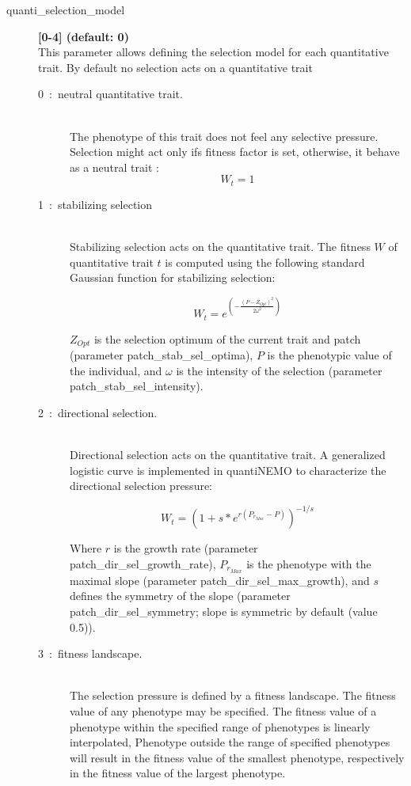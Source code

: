 \documentclass[letterpaper,12pt,oneside]{book}
\begin{document}
\begin{description}
\item[quanti\_selection\_model]\textbf{[0-4] (default: 0)}\\
This parameter allows defining the selection model for each quantitative trait. By default no
selection acts on a quantitative trait
\begin{description}

\item [0~:~neutral quantitative trait.] \textbf{}\\
The phenotype of this trait does not feel any selective pressure. Selection might act only ifs fitness factor is set, otherwise, it behave as a neutral trait :
\[ W_{t} = 1\]
 
\item [1~:~stabilizing selection] \textbf{}\\
Stabilizing selection acts on the quantitative trait. The fitness $W$ of quantitative trait $t$ is
computed using the following standard Gaussian function for stabilizing selection:

\[W_{t} = e^{\left(-\frac{\left(P-Z_{Opt}\right)^2}{2\omega^{2}}\right)} \]

$Z_{Opt}$ is the selection optimum of the current trait and patch (parameter \textsf{patch\_stab\_sel\_optima}), $P$ is the phenotypic value of the individual, and $\omega$ is the intensity of the selection (parameter \textsf{patch\_stab\_sel\_intensity}). 

\item [2~:~directional selection.] \textbf{}\\
Directional selection acts on the quantitative trait. A generalized logistic curve \citep{Richards_1959} is implemented in quantiNEMO to characterize the directional selection pressure:

	\[ W_{t} = \left(1+s*e^{r(P_{r_{Max}}-P)}\right)^{-1/s}\]

Where $r$ is the growth rate (parameter \textsf{patch\_dir\_sel\_growth\_rate}), $P_{r_{Max}}$ is the phenotype with the maximal slope (parameter \textsf{patch\_dir\_sel\_max\_growth}), and $s$ defines the symmetry of the slope (parameter \textsf{patch\_dir\_sel\_symmetry}; slope is symmetric by default (value 0.5)).

\item [3~:~fitness landscape.] \textbf{}\\
The selection pressure is defined by a fitness landscape. The fitness value of any phenotype may be specified. The fitness value of a phenotype within the specified range of phenotypes is linearly interpolated, Phenotype outside the range of specified phenotypes will result in the fitness value of the smallest phenotype, respectively in the fitness value of the largest phenotype.
 

\end{description}
\end{description}
\end{document}
